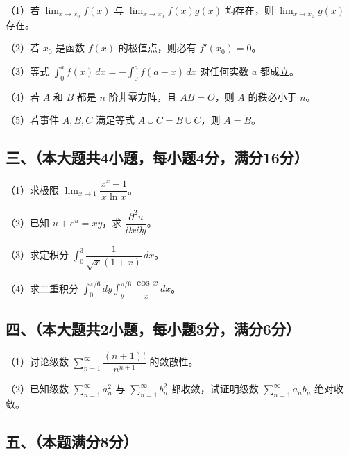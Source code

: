 \documentclass[UTF8,12pt]{ctexart}
\begin{document}
（1）若 \(\displaystyle \lim_{x\to x_0}f(x)\) 与 \(\displaystyle \lim_{x\to x_0}f(x)g(x)\) 均存在，则 \(\displaystyle \lim_{x\to x_0}g(x)\) 存在。


（2）若 \(\displaystyle x_0\) 是函数 \(\displaystyle f(x)\) 的极值点，则必有 \(\displaystyle f\prime(x_0)=0\)。


（3）等式 \(\displaystyle \int_0^a f(x)\,dx=-\displaystyle \int_0^a f(a-x)\,dx\) 对任何实数 \(\displaystyle a\) 都成立。


（4）若 \(\displaystyle A\) 和 \(\displaystyle B\) 都是 \(\displaystyle n\) 阶非零方阵，且 \(\displaystyle AB=O\)，则 \(\displaystyle A\) 的秩必小于 \(\displaystyle n\)。


（5）若事件 \(\displaystyle A,\allowbreak B,\allowbreak C\) 满足等式 \(\displaystyle A\cup C=B\cup C\)，则 \(\displaystyle A=B\)。


\subsection*{三、（本大题共4小题，每小题4分，满分16分）}

（1）求极限 \(\displaystyle \lim_{x\to1}\dfrac{\displaystyle x^x-1}{\displaystyle x\ln x}\)。


（2）已知 \(\displaystyle u+e^u=xy\)，求 \(\displaystyle \dfrac{\displaystyle \partial^2u}{\displaystyle \partial x\partial y}\)。


（3）求定积分 \(\displaystyle \int_0^3\dfrac{\displaystyle 1}{\displaystyle \sqrt x(1+x)}\,dx\)。


（4）求二重积分 \(\displaystyle \int_0^{\pi/6}dy\displaystyle \int_y^{\pi/6}\dfrac{\displaystyle \cos x}{\displaystyle x}\,dx\)。


\subsection*{四、（本大题共2小题，每小题3分，满分6分）}

（1）讨论级数 \(\displaystyle \sum_{n=1}^{\infty}\dfrac{\displaystyle (n+1)!}{\displaystyle n^{n+1}}\) 的敛散性。


（2）已知级数 \(\displaystyle \sum_{n=1}^{\infty}a_n^2\) 与 \(\displaystyle \sum_{n=1}^{\infty}b_n^2\) 都收敛，试证明级数 \(\displaystyle \sum_{n=1}^{\infty}a_nb_n\) 绝对收敛。


\subsection*{五、（本题满分8分）}
\end{document}
